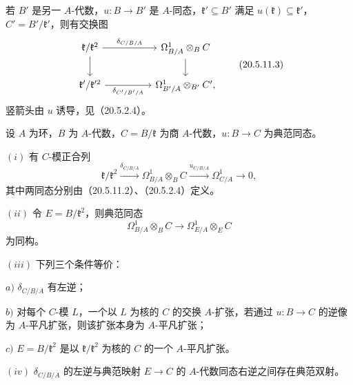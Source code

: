 若 $B'$ 是另一 $A$-代数，$u:B\to B'$ 是 $A$-同态，$\mathfrak k'\subseteq B'$ 满足 $u(\mathfrak k)\subseteq\mathfrak k'$，$C'=B'/\mathfrak k'$，则有交换图
\begin{equation}
\begin{tikzcd}[column sep=huge]
 \mathfrak k/\mathfrak k^2\arrow[r,"\delta_{C/B/A}"]\arrow[d]&\Omega^1_{B/A}\otimes_B C\arrow[d]\\
 \mathfrak k'/\mathfrak k'^2\arrow[r,"\delta_{C'/B'/A}"']&\Omega^1_{B'/A}\otimes_{B'} C',
\end{tikzcd}
\tag{20.5.11.3}
\end{equation}
竖箭头由 $u$ 诱导，见（20.5.2.4）。

设 $A$ 为环，$B$ 为 $A$-代数，$C=B/\mathfrak k$ 为商 $A$-代数，$u:B\to C$ 为典范同态。

$(i)$ 有 $C$-模正合列
\begin{equation}
 \mathfrak k/\mathfrak k^2\xrightarrow{\delta_{C/B/A}}
 \Omega^1_{B/A}\otimes_B C\xrightarrow{u_{C/B/A}}
 \Omega^1_{C/A}\longrightarrow0,
 \tag{20.5.12.1}
\end{equation}
其中两同态分别由（20.5.11.2）、（20.5.2.4）定义。

$(ii)$ 令 $E=B/\mathfrak k^2$，则典范同态
\[
 \Omega^1_{B/A}\otimes_B C\longrightarrow\Omega^1_{E/A}\otimes_E C
\]
为同构。

$(iii)$ 下列三个条件等价：

$a)$ $\delta_{C/B/A}$ 有左逆；

$b)$ 对每个 $C$-模 $L$，一个以 $L$ 为核的 $C$ 的交换 $A$-扩张，若通过 $u:B\to C$ 的逆像为 $A$-平凡扩张，则该扩张本身为 $A$-平凡扩张；

$c)$ $E=B/\mathfrak k^2$ 是以 $\mathfrak k/\mathfrak k^2$ 为核的 $C$ 的一个 $A$-平凡扩张。

$(iv)$ $\delta_{C/B/A}$ 的左逆与典范映射 $E\to C$ 的 $A$-代数同态右逆之间存在典范双射。

